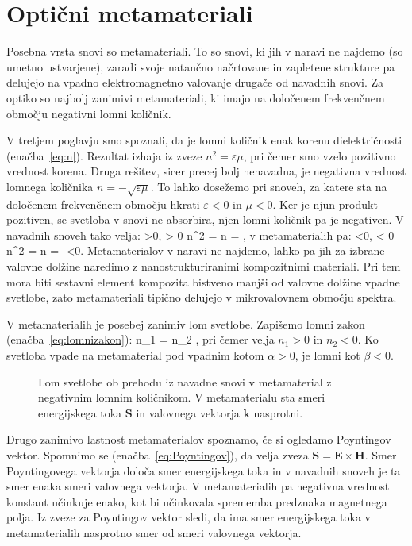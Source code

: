 \section{Optični metamateriali}
Posebna vrsta snovi so metamateriali. To so snovi, ki jih v naravi ne najdemo (so umetno
ustvarjene), zaradi svoje natančno načrtovane in zapletene strukture pa delujejo na 
vpadno elektromagnetno valovanje drugače od navadnih snovi. Za optiko so najbolj zanimivi
metamateriali, ki imajo na določenem frekvenčnem območju negativni lomni količnik.

V tretjem poglavju smo spoznali, da je lomni količnik enak korenu dielektričnosti
(enačba~\ref{eq:n}). Rezultat izhaja iz zveze $n^2 = \varepsilon \mu$, pri čemer smo 
vzelo pozitivno vrednost korena. Druga rešitev, sicer precej bolj nenavadna, je negativna
vrednost lomnega količnika $n = - \sqrt{\varepsilon \mu}$. To lahko dosežemo pri snoveh,
za katere sta na določenem frekvenčnem območju hkrati $\varepsilon<0$ in $\mu<0$. 
Ker je njun produkt pozitiven, se svetloba v snovi ne absorbira, njen lomni količnik 
pa je negativen. V navadnih snoveh tako velja:
\beq
\varepsilon >0, \mu > 0 \qquad \Rightarrow \qquad n^2 = \varepsilon \mu 
\qquad \Rightarrow \qquad n = \sqrt{\varepsilon\mu},
\label{eq:09_37m}
\eeq
v metamaterialih pa:
\beq
\varepsilon <0, \mu < 0 \qquad \Rightarrow \qquad n^2 = \varepsilon \mu 
\qquad \Rightarrow \qquad n = -\sqrt{\varepsilon\mu}<0. 
\label{eq:09_38}
\eeq
Metamaterialov v naravi ne najdemo, lahko pa jih za izbrane valovne dolžine naredimo z
nanostrukturiranimi kompozitnimi materiali. Pri tem mora biti sestavni element kompozita
bistveno manjši od valovne dolžine vpadne svetlobe, zato metamateriali tipično delujejo v 
mikrovalovnem območju spektra.

V metamaterialih je posebej zanimiv lom svetlobe. Zapišemo lomni zakon 
(enačba~\ref{eq:lomnizakon}):
\beq
n_1 \sin\alpha = n_2 \sin\beta,
\label{eq:09_39}
\eeq
pri čemer velja $n_1>0$ in $n_2<0$. Ko svetloba vpade na metamaterial pod vpadnim
kotom $\alpha>0 $, je lomni kot $\beta <0$. 
\begin{figure}[h]
\centering
\def\svgwidth{80truemm} 

\caption{Lom svetlobe ob prehodu iz navadne snovi v metamaterial z negativnim lomnim
količnikom. V metamaterialu sta smeri energijskega toka $\mathbf{S}$ 
in valovnega vektorja $\mathbf{k}$ nasprotni.}
\label{fig:09_meta}
\end{figure}

Drugo zanimivo lastnost  metamaterialov spoznamo, če si ogledamo Poyntingov vektor. 
Spomnimo se (enačba~\ref{eq:Poyntingov}), da velja zveza 
$\mathbf{S} = \mathbf{E}\times \mathbf{H}$. Smer Poyntingovega vektorja določa smer
energijskega toka in v navadnih snoveh je ta smer enaka smeri valovnega vektorja.
V metamaterialih pa negativna vrednost konstant učinkuje enako, kot bi učinkovala
sprememba predznaka magnetnega polja. Iz zveze za Poyntingov vektor sledi, da ima
smer energijskega toka v metamaterialih nasprotno smer od smeri valovnega vektorja. 

